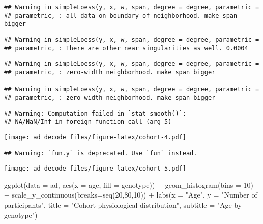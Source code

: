 \documentclass[
]{article}
\newenvironment{Shaded}{\begin{snugshade}}{\end{snugshade}}
\newcommand{\AttributeTok}[1]{\textcolor[rgb]{0.77,0.63,0.00}{#1}}
\newcommand{\DecValTok}[1]{\textcolor[rgb]{0.00,0.00,0.81}{#1}}
\newcommand{\FunctionTok}[1]{\textcolor[rgb]{0.00,0.00,0.00}{#1}}
\newcommand{\NormalTok}[1]{#1}
\newcommand{\SpecialCharTok}[1]{\textcolor[rgb]{0.00,0.00,0.00}{#1}}
\newcommand{\StringTok}[1]{\textcolor[rgb]{0.31,0.60,0.02}{#1}}
\begin{document}
\begin{verbatim}
## Warning in simpleLoess(y, x, w, span, degree = degree, parametric =
## parametric, : all data on boundary of neighborhood. make span bigger
\end{verbatim}

\begin{verbatim}
## Warning in simpleLoess(y, x, w, span, degree = degree, parametric =
## parametric, : There are other near singularities as well. 0.0004
\end{verbatim}

\begin{verbatim}
## Warning in simpleLoess(y, x, w, span, degree = degree, parametric =
## parametric, : zero-width neighborhood. make span bigger

## Warning in simpleLoess(y, x, w, span, degree = degree, parametric =
## parametric, : zero-width neighborhood. make span bigger
\end{verbatim}

\begin{verbatim}
## Warning: Computation failed in `stat_smooth()`:
## NA/NaN/Inf in foreign function call (arg 5)
\end{verbatim}

\texttt{[image: ad\_decode\_files/figure-latex/cohort-4.pdf]}

\begin{verbatim}
## Warning: `fun.y` is deprecated. Use `fun` instead.
\end{verbatim}

\texttt{[image: ad\_decode\_files/figure-latex/cohort-5.pdf]}

\begin{Shaded}
\begin{Highlighting}[]
\FunctionTok{ggplot}\NormalTok{(}\AttributeTok{data =}\NormalTok{ ad, }\FunctionTok{aes}\NormalTok{(}\AttributeTok{x =}\NormalTok{ age, }\AttributeTok{fill =}\NormalTok{ genotype)) }\SpecialCharTok{+}
  \FunctionTok{geom\_histogram}\NormalTok{(}\AttributeTok{bins =} \DecValTok{10}\NormalTok{) }\SpecialCharTok{+}
  \FunctionTok{scale\_y\_continuous}\NormalTok{(}\AttributeTok{breaks=}\FunctionTok{seq}\NormalTok{(}\DecValTok{20}\NormalTok{,}\DecValTok{80}\NormalTok{,}\DecValTok{10}\NormalTok{)) }\SpecialCharTok{+}
  \FunctionTok{labs}\NormalTok{(}\AttributeTok{x =} \StringTok{"Age"}\NormalTok{,}
    \AttributeTok{y =} \StringTok{"Number of participants"}\NormalTok{,}
    \AttributeTok{title =} \StringTok{"Cohort physiological distribution"}\NormalTok{,}
    \AttributeTok{subtitle =} \StringTok{"Age by genotype"}\NormalTok{)}
\end{Highlighting}
\end{Shaded}
\end{document}
